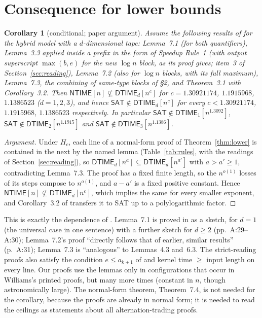 \documentclass[11pt]{article}
\newtheorem{corollary}[theorem]{Corollary}
\theoremstyle{definition}
\newcommand{\DTIME}{\mathsf{DTIME}}
\newcommand{\NTIME}{\mathsf{NTIME}}
\newcommand{\SAT}{\mathsf{SAT}}
\begin{document}
\section{Consequence for lower bounds}\label{sec:consequence}

\begin{corollary}[conditional; paper argument]\label{cor:lb}
Assume the following results of \cite{W13} for the hybrid model with a $d$-dimensional tape: Lemma~7.1 (for both quantifiers), Lemma~3.3 applied inside a prefix in the form of Speedup Rule~1 (with output superscript $\max(b,e)$ for the new $\log n$ block, as its proof gives; item~3 of Section~\ref{sec:reading}), Lemma~7.2 (also for $\log n$ blocks, with its full maximum), Lemma~7.3, the combining of same-type blocks of \S2, and Theorem~3.1 with Corollary~3.2. Then $\NTIME[n]\not\subseteq\DTIME_d[n^{c}]$ for $c=1.30921174$, $1.1915968$, $1.1386523$ ($d=1,2,3$), and hence $\SAT\notin\DTIME_d[n^{c}]$ for every $c<1.30921174$, $1.1915968$, $1.1386523$ respectively. In particular $\SAT\notin\DTIME_1[n^{1.3092}]$, $\SAT\notin\DTIME_2[n^{1.1915}]$ and $\SAT\notin\DTIME_3[n^{1.1386}]$.
\end{corollary}
\begin{proof}[Argument]
Under $H_c$, each line of a normal-form proof of Theorem~\ref{thm:lower} is contained in the next by the named lemma (Table~\ref{tab:rules}, with the readings of Section~\ref{sec:reading}), so $\DTIME_d[n^{a}]\subseteq\DTIME_d[n^{a'}]$ with $a>a'\ge1$, contradicting Lemma~7.3. The proof has a fixed finite length, so the $n^{o(1)}$ losses of its steps compose to $n^{o(1)}$, and $a-a'$ is a fixed positive constant. Hence $\NTIME[n]\not\subseteq\DTIME_d[n^c]$, which implies the same for every smaller exponent, and Corollary~3.2 of \cite{W13} transfers it to SAT up to a polylogarithmic factor.
\end{proof}
This is exactly the dependence of \cite[Theorem~7.5]{W13}. Lemma~7.1 is proved in \cite{W13} as a sketch, for $d=1$ (the universal case in one sentence) with a further sketch for $d\ge2$ (pp.~A:29--A:30); Lemma~7.2's proof ``directly follows that of earlier, similar results'' (p.~A:31); Lemma~7.3 is ``analogous'' to Lemmas~4.3 and~6.3. The strict-reading proofs also satisfy the condition $e\le a_{k+1}$ of \cite[Lemma~5.2]{Wfull} and kernel time $\ge$ input length on every line. Our proofs use the lemmas only in configurations that occur in Williams's printed proofs, but many more times (constant in $n$, though astronomically large). The normal-form theorem, Theorem~7.4, is not needed for the corollary, because the proofs are already in normal form; it is needed to read the ceilings as statements about all alternation-trading proofs.
\end{document}
